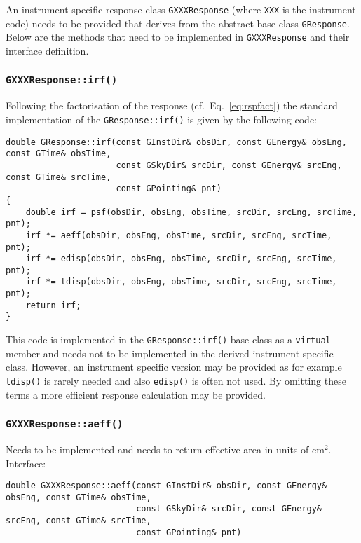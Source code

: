 \documentclass{article}[12pt,a4]
\begin{document}
An instrument specific response class {\tt GXXXResponse} (where {\tt XXX} is the instrument code)
needs to be provided that derives from the abstract base class {\tt GResponse}.
Below are the methods that need to be implemented in {\tt GXXXResponse} and their interface
definition.

\subsubsection{{\tt GXXXResponse::irf()}}

Following the factorisation of the response (cf.~Eq.~\ref{eq:rspfact}) the standard implementation
of the {\tt GResponse::irf()} is given by the following code:
\begin{verbatim}
double GResponse::irf(const GInstDir& obsDir, const GEnergy& obsEng, const GTime& obsTime,
                      const GSkyDir& srcDir, const GEnergy& srcEng, const GTime& srcTime,
                      const GPointing& pnt)
{
    double irf = psf(obsDir, obsEng, obsTime, srcDir, srcEng, srcTime, pnt);
    irf *= aeff(obsDir, obsEng, obsTime, srcDir, srcEng, srcTime, pnt);
    irf *= edisp(obsDir, obsEng, obsTime, srcDir, srcEng, srcTime, pnt);
    irf *= tdisp(obsDir, obsEng, obsTime, srcDir, srcEng, srcTime, pnt);
    return irf;
}
\end{verbatim}
This code is implemented in the {\tt GResponse::irf()} base class as a {\tt virtual} member and
needs not to be implemented in the derived instrument specific class.
However, an instrument specific version may be provided as for example {\tt tdisp()} is rarely
needed and also {\tt edisp()} is often not used.
By omitting these terms a more efficient response calculation may be provided.


\subsubsection{{\tt GXXXResponse::aeff()}}

Needs to be implemented and needs to return effective area in units of cm$^2$.
Interface:
\begin{verbatim}
double GXXXResponse::aeff(const GInstDir& obsDir, const GEnergy& obsEng, const GTime& obsTime,
                          const GSkyDir& srcDir, const GEnergy& srcEng, const GTime& srcTime,
                          const GPointing& pnt)
\end{verbatim}
\end{document}
